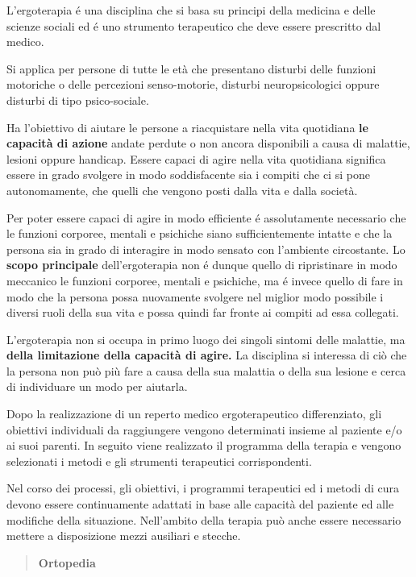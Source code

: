 \documentclass[]{article}
\begin{document}
L'ergoterapia é una disciplina che si basa su principi della medicina e
delle scienze sociali ed é uno strumento terapeutico che deve essere
prescritto dal medico.

Si applica per persone di tutte le età che presentano disturbi delle
funzioni motoriche o delle percezioni senso-motorie, disturbi
neuropsicologici oppure disturbi di tipo psico-sociale.

Ha l'obiettivo di aiutare le persone a riacquistare nella vita
quotidiana \textbf{le capacità di azione} andate perdute o non ancora
disponibili a causa di malattie, lesioni oppure handicap. Essere capaci
di agire nella vita quotidiana significa essere in grado svolgere in
modo soddisfacente sia i compiti che ci si pone autonomamente, che
quelli che vengono posti dalla vita e dalla società.

Per poter essere capaci di agire in modo efficiente é assolutamente
necessario che le funzioni corporee, mentali e psichiche siano
sufficientemente intatte e che la persona sia in grado di interagire in
modo sensato con l'ambiente circostante. Lo \textbf{scopo principale}
dell'ergoterapia non é dunque quello di ripristinare in modo meccanico
le funzioni corporee, mentali e psichiche, ma é invece quello di fare in
modo che la persona possa nuovamente svolgere nel miglior modo possibile
i diversi ruoli della sua vita e possa quindi far fronte ai compiti ad
essa collegati.

L'ergoterapia non si occupa in primo luogo dei singoli sintomi delle
malattie, ma \textbf{della limitazione della capacità di agire.} La
disciplina si interessa di ciò che la persona non può più fare a causa
della sua malattia o della sua lesione e cerca di individuare un modo
per aiutarla.

Dopo la realizzazione di un reperto medico ergoterapeutico
differenziato, gli obiettivi individuali da raggiungere vengono
determinati insieme al paziente e/o ai suoi parenti. In seguito viene
realizzato il programma della terapia e vengono selezionati i metodi e
gli strumenti terapeutici corrispondenti.

Nel corso dei processi, gli obiettivi, i programmi terapeutici ed i
metodi di cura devono essere continuamente adattati in base alle
capacità del paziente ed alle modifiche della situazione. Nell'ambito
della terapia può anche essere necessario mettere a disposizione mezzi
ausiliari e stecche.

\begin{quote}
\textbf{Ortopedia}
\end{quote}
\end{document}

